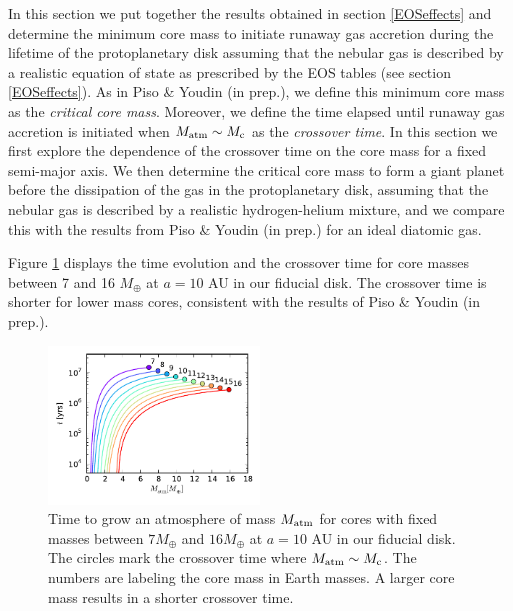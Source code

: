 \documentclass[apj]{emulateapj}
\newcommand{\co}{_{\rm c}}
\begin{document}
In this section we put together the results obtained in section \ref{EOSeffects} and determine the minimum core mass to initiate runaway gas accretion during the lifetime of the protoplanetary disk assuming that the nebular gas is described by a realistic equation of state as prescribed by the \citet{saumon95} EOS tables (see section \ref{EOSeffects}). As in Piso \& Youdin (in prep.), we define this minimum core mass as the \textit{critical core mass}. Moreover, we define the time elapsed until runaway gas accretion is initiated when $M_{\rm{atm}} \sim M\co$ as the \textit{crossover time}. In this section we first explore the dependence of the crossover time on the core mass for a fixed semi-major axis. We then determine the critical core mass to form a giant planet before the dissipation of the gas in the protoplanetary disk, assuming that the nebular gas is described by a realistic hydrogen-helium mixture, and we compare this with the results from Piso \& Youdin (in prep.) for an ideal diatomic gas. 



Figure \ref{fig:tvsMplot} displays the time evolution and the crossover time for core masses between 7 and 16 $M_{\oplus}$ at $a=10$ AU in our fiducial disk. The crossover time is shorter for lower mass cores, consistent with the results of Piso \& Youdin (in prep.). 

\begin{figure}[h!]
\centering
\includegraphics[width=0.5\textwidth]{../../figs/ModelAtmospheres/RadSelfGravRealEOS/t_vs_M_10au.pdf}
\caption{Time to grow an atmosphere of mass $M_{\rm{atm}}$ for cores with fixed masses between $7 M_{\oplus}$ and $16 M_{\oplus}$ at $a=10$ AU in our fiducial disk. The circles mark the crossover time where $M_{\rm{atm}} \sim M_{\rm c}$. The numbers are labeling the core mass in Earth masses. A larger core mass results in a shorter crossover time.}
\label{fig:tvsMplot}
\end{figure}
\end{document}
